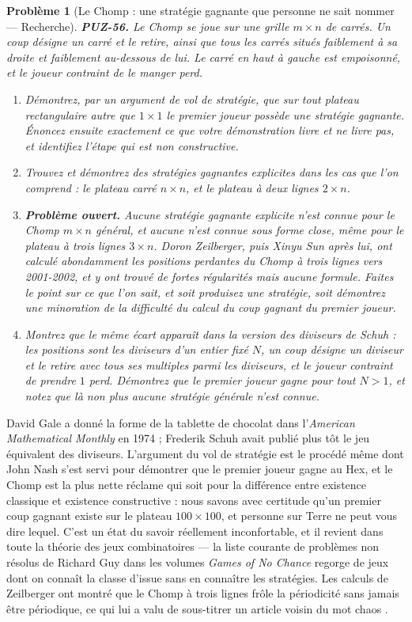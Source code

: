 \documentclass[11pt]{article}
\newtheorem{problem}{Problème}
\begin{document}
\begin{problem}[{Le Chomp : une stratégie gagnante que personne ne sait nommer --- Recherche}]
\textbf{PUZ-56.} Le Chomp se joue sur une grille $ m \times n $ de carrés. Un coup
désigne un carré et le retire, ainsi que tous les carrés situés faiblement à sa droite et
faiblement au-dessous de lui. Le carré en haut à gauche est empoisonné, et le joueur contraint
de le manger perd.
\begin{enumerate}
\item[(a)] Démontrez, par un argument de vol de stratégie, que sur tout plateau rectangulaire autre
que $ 1 \times 1 $ le premier joueur possède une stratégie gagnante. Énoncez ensuite
exactement ce que votre démonstration livre et ne livre pas, et identifiez l'étape qui est non
constructive.
\item[(b)] Trouvez et démontrez des stratégies gagnantes explicites dans les cas que l'on comprend :
le plateau carré $ n \times n $, et le plateau à deux lignes $ 2 \times n $.
\item[(c)] \textbf{Problème ouvert.} Aucune stratégie gagnante explicite n'est connue pour le Chomp
$ m \times n $ général, et aucune n'est connue sous forme close, même pour le plateau à
trois lignes $ 3 \times n $. Doron Zeilberger, puis Xinyu Sun après lui, ont calculé
abondamment les positions perdantes du Chomp à trois lignes vers 2001-2002, et y ont trouvé de
fortes régularités mais aucune formule. Faites le point sur ce que l'on sait, et soit
produisez une stratégie, soit démontrez une minoration de la difficulté du calcul du coup
gagnant du premier joueur.
\item[(d)] Montrez que le même écart apparaît dans la version des diviseurs de Schuh : les positions
sont les diviseurs d'un entier fixé $ N $, un coup désigne un diviseur et le retire avec
tous ses multiples parmi les diviseurs, et le joueur contraint de prendre $ 1 $ perd.
Démontrez que le premier joueur gagne pour tout $ N > 1 $, et notez que là non plus aucune
stratégie générale n'est connue.
\end{enumerate}

\end{problem}

\noindent David Gale a donné la forme de la tablette de chocolat dans l'\textit{American
Mathematical Monthly} en 1974 ; Frederik Schuh avait publié plus tôt le jeu équivalent des
diviseurs. L'argument du vol de stratégie est le procédé même dont John Nash s'est servi pour
démontrer que le premier joueur gagne au Hex, et le Chomp est la plus nette réclame qui soit
pour la différence entre existence classique et existence constructive : nous savons avec
certitude qu'un premier coup gagnant existe sur le plateau $ 100 \times 100 $, et personne
sur Terre ne peut vous dire lequel. C'est un état du savoir réellement inconfortable, et il
revient dans toute la théorie des jeux combinatoires --- la liste courante de problèmes non
résolus de Richard Guy dans les volumes \textit{Games of No Chance} regorge de jeux dont on
connaît la classe d'issue sans en connaître les stratégies. Les calculs de Zeilberger ont
montré que le Chomp à trois lignes frôle la périodicité sans jamais être périodique, ce qui
lui a valu de sous-titrer un article voisin du mot \og{} chaos \fg{}.
\end{document}
